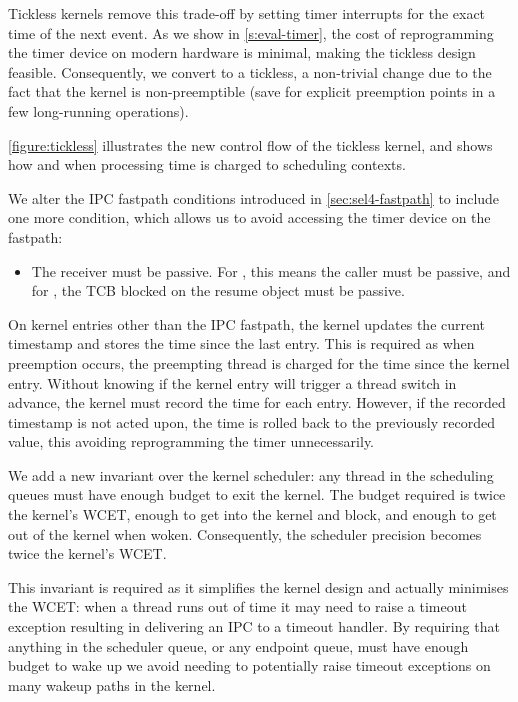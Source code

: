 Tickless kernels remove this trade-off by setting timer interrupts for the exact time of the next
event. As we show in \cref{s:eval-timer}, the cost of reprogramming the timer device on modern
hardware is minimal, making the tickless design feasible. Consequently, we convert \selfour
to a tickless, a non-trivial change due to the fact that the kernel is non-preemptible (save for
explicit preemption points in a few long-running operations). 

\cref{figure:tickless} illustrates the new control flow of the tickless kernel, and shows
how and when processing time is charged to scheduling contexts.

We alter the IPC fastpath conditions introduced in \cref{sec:sel4-fastpath} to include one
more condition, which allows us to avoid accessing the timer device on the fastpath:
\begin{itemize}
    \item The receiver must be passive. For \call, this means the caller must be passive, and
          for \replyrecv, the TCB blocked on the resume object must be passive.
\end{itemize}

\label{p:impl-fastpath}
On kernel entries other than the IPC fastpath, the kernel updates the current
timestamp and stores the time since the last entry. This is required as when preemption occurs, the
preempting thread is charged for the time since the kernel entry. Without knowing if the kernel entry will
trigger a thread switch in advance, the kernel must record the time for each entry. However, if the
recorded timestamp is not acted upon, the time is rolled back to the previously recorded value,
this avoiding reprogramming the timer unnecessarily.

We add a new invariant over the kernel scheduler: any thread in the 
scheduling queues must have enough budget to exit the kernel. The budget required is twice the
kernel's WCET, enough to get into the kernel and block, and enough to get out of the kernel 
when woken. 
Consequently, the scheduler precision becomes twice the kernel's WCET.

This invariant is required as it simplifies the kernel design and actually minimises the WCET: when
a
thread runs out of time it may need to raise a timeout exception resulting in delivering an IPC to a
timeout handler. By requiring that anything in the scheduler queue, or any endpoint queue, must have
enough budget to wake up we avoid needing to potentially raise timeout exceptions on many wakeup
paths in the kernel.

